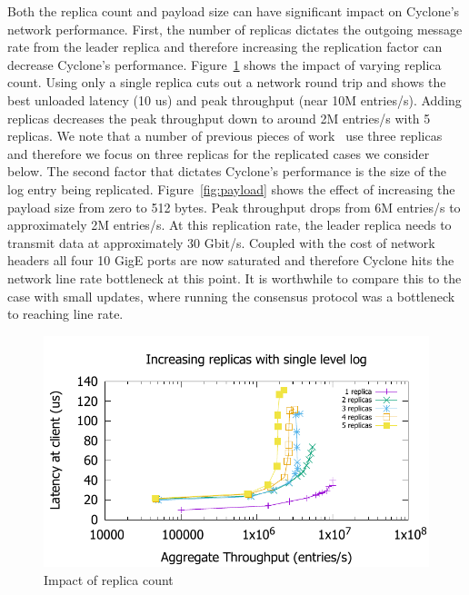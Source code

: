 \documentclass[twocolumn]{article}
\begin{document}
Both the replica count and payload size can have significant impact on Cyclone's
network performance. First, the number of replicas dictates the outgoing message
rate from the leader replica and therefore increasing the replication factor can
decrease Cyclone's performance. Figure~\ref{fig:replicas} shows the impact of
varying replica count. Using only a single replica cuts out a network round trip
and shows the best unloaded latency (10 us) and peak throughput (near 10M
entries/s). Adding replicas decreases the peak throughput down to around 2M
entries/s with 5 replicas. We note that a number of previous pieces of
work~\cite{faast, farm} use three replicas and therefore we focus on three
replicas for the replicated cases we consider below. The second factor that
dictates Cyclone's performance is the size of the log entry being
replicated. Figure~\ref{fig:payload} shows the effect of increasing the payload
size from zero to 512 bytes. Peak throughput drops from 6M entries/s to
approximately 2M entries/s. At this replication rate, the leader replica needs
to transmit data at approximately 30 Gbit/s. Coupled with the cost of network
headers all four 10 GigE ports are now saturated and therefore Cyclone hits the
network line rate bottleneck at this point. It is worthwhile to compare this to
the case with small updates, where running the consensus protocol was a
bottleneck to reaching line rate.

\begin{figure}
  \includegraphics[scale=0.6]{results2/replicas.pdf}
  \caption{Impact of replica count}
  \label{fig:replicas}
\end{figure}
\end{document}
